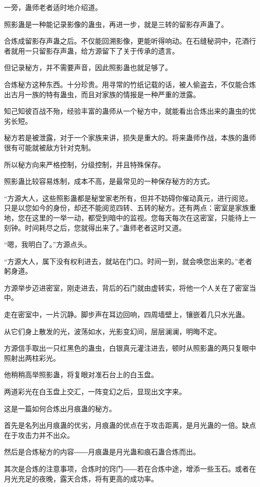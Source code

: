 \begin{this_body}
一旁，蛊师老者适时地介绍道。

照影蛊是一种能记录影像的蛊虫，再进一步，就是三转的留影存声蛊了。

合炼成留影存声蛊之后。不仅能回溯影像，更能听得响动。在石缝秘洞中，花酒行者就用一只留影存声蛊，给方源留下了关于传承的遗言。

但记录秘方，并不需要声音，因此照影蛊也就足够了。

合炼秘方这种东西。十分珍贵。用寻常的竹纸记载的话，被人偷盗去，不仅能合炼出古月一族的特有蛊虫，而且对家族的情报是一种严重的泄露。

知己知彼百战不殆，经验丰富的蛊师从一个秘方中，就能看出合炼出来的蛊虫的优劣长短。

秘方若是被泄露，对于一个家族来讲，损失是重大的。将来蛊师作战，本族的蛊师很有可能就被敌方针对克制。

所以秘方向来严格控制，分级控制，并且特殊保存。

照影蛊比较容易炼制，成本不高，是最常见的一种保存秘方的方式。

“方源大人，这些照影蛊都是秘堂家老所有，但并不妨碍你催动真元，进行阅览。只是以您如今的身份，却还不能阅览四转、五转的秘方。还有两点：密室是家族重地，您在这里的一举一动，都受到暗中的监视。您每天每次在这密室，只能待上一刻钟。时间耗尽之后，您就得出来了。”蛊师老者这时又道。

“嗯，我明白了。”方源点头。

“方源大人，属下没有权利进去，就站在门口。时间一到，就会唤您出来的。”老者躬身道。

方源举步迈进密室，刚走进去，背后的石门就由虚转实，将他一个人关在了密室当中。

走在密室中，一片沉静。脚步声在耳边回响，四周墙壁上，镶嵌着几只水光蛊。

从它们身上散发的光，波荡如水，光影变幻间，层层澜澜，明晦不定。

方源信手取出一只红黑色的蛊虫，白银真元灌注进去，顿时从照影蛊的两只复眼中照射出两柱彩光。

他稍稍高举照影蛊，将复眼对准石台上的白玉盘。

两道彩光在白玉盘上交汇，一阵变幻之后，显现出文字来。

这是一篇如何合炼出月痕蛊的秘方。

首先是名列出月痕蛊的优劣，月痕蛊的优点在于攻击距离，是月光蛊的一倍。缺点在于攻击力并不出众。

然后是合炼秘方的内容――月痕蛊是月光蛊和痕石蛊合炼而出。

其次是合炼的注意事项，合炼时的窍门――若在合炼中途，增添一些玉石。或者在月光充足的夜晚，露天合炼，将有更高的成功率。


\end{this_body}
